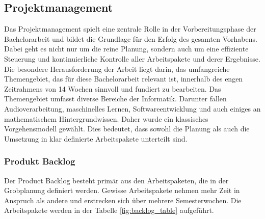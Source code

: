 \documentclass[main.tex]{subfiles} %
\begin{document}
\subsection{Projektmanagement}
Das Projektmanagement spielt eine zentrale Rolle in der Vorbereitungsphase der Bachelorarbeit 
und bildet die Grundlage für den Erfolg des gesamten Vorhabens. Dabei geht es nicht nur um die 
reine Planung, sondern auch um eine effiziente Steuerung und kontinuierliche Kontrolle aller 
Arbeitspakete und derer Ergebnisse. Die besondere Herausforderung der Arbeit liegt darin, 
das umfangreiche Themengebiet, das für diese Bachelorarbeit relevant ist, innerhalb des engen 
Zeitrahmens von 14 Wochen sinnvoll und fundiert zu bearbeiten. Das Themengebiet umfasst diverse 
Bereiche der Informatik. Darunter fallen Audioverarbeitung, maschinelles Lernen, 
Softwareentwicklung und auch einiges an mathematischem Hintergrundwissen. Daher wurde ein 
klassisches Vorgehensmodell gewählt. Dies bedeutet, dass sowohl die Planung als auch die Umsetzung 
in klar definierte Arbeitspakete unterteilt sind. 

\newpage
\subsubsection{Produkt Backlog}

Der Product Backlog besteht primär aus den Arbeitspaketen, die in der Grobplanung definiert werden.
Gewisse Arbeitspakete nehmen mehr Zeit in Anspruch als andere und erstrecken sich über mehrere
Semesterwochen. Die Arbeitspakete werden in der Tabelle \ref{fig:backlog_table} aufgeführt.
\end{document}
